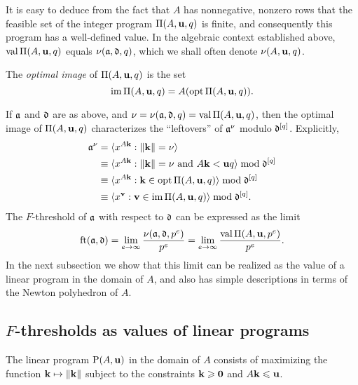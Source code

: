 \documentclass[11pt]{amsart}
\begin{document}
It is easy to deduce from the fact that $A$ has nonnegative, nonzero rows that the feasible set of the integer program $\Pi(A,\mathbf{u},q)$ is finite, and consequently this program has a well-defined value.
In the algebraic context established above, $\operatorname{val} \Pi(A,\mathbf{u},q)$ equals $\nu(\mathfrak{a},\mathfrak{d},q)$, which we shall often denote $\nu(A,\mathbf{u},q)$.

\begin{definition}
   The \emph{optimal image} of $\Pi(A, \mathbf{u}, q)$ is the set \[ \operatorname{im} \Pi(A, \mathbf{u}, q) = A ( \operatorname{opt} \Pi(A, \mathbf{u}, q) ). \] 
\end{definition}

If $\mathfrak{a}$ and $\mathfrak{d}$ are as above, and $\nu = \nu(\mathfrak{a},\mathfrak{d},q) = \operatorname{val} \Pi(A,\mathbf{u},q)$, then the optimal image of $\Pi(A,\mathbf{u},q)$ characterizes the ``leftovers'' of $\mathfrak{a}^\nu$ modulo $\mathfrak{d}^{[q]}$.
Explicitly,
\begin{align*}
  \mathfrak{a}^{\nu} &= \langle x^{A\mathbf{k}}: \| \mathbf{k} \|=\nu \rangle\\
  &\equiv \langle x^{A\mathbf{k}}: \| \mathbf{k} \|=\nu\text{ and } A\mathbf{k} <\mathbf{u}q \rangle \bmod \mathfrak{d}^{[q]}\\
  &\equiv \langle x^{A\mathbf{k}}: \mathbf{k}\in \operatorname{opt}\Pi(A,\mathbf{u},q) \rangle \bmod \mathfrak{d}^{[q]}\\
  &\equiv \langle x^{\mathbf{v}}: \mathbf{v} \in \operatorname{im} \Pi(A,\mathbf{u},q) \rangle \bmod \mathfrak{d}^{[q]}.
\end{align*}
The $F$-threshold of $\mathfrak{a}$ with respect to $\mathfrak{d}$ can be expressed as the limit
\begin{equation}\label{eq: limit}
\operatorname{ft}(\mathfrak{a}, \mathfrak{d}) = \lim_{e\to\infty} \frac{\nu(\mathfrak{a},\mathfrak{d},p^e)}{p^e} = \lim_{e\to\infty} \frac{\operatorname{val} \Pi(A,\mathbf{u},p^e)}{p^e}.
\end{equation}
In the next subsection we show that this limit can be realized as the value of a linear program in the domain of $A$, and also has simple descriptions in terms of the Newton polyhedron of $A$.

\subsection{$F$-thresholds as values of linear programs}

\begin{definition}
   The linear program $\mathrm{P}(A, \mathbf{u})$ in the domain of $A$ consists of maximizing the function $\mathbf{k} \mapsto \| \mathbf{k} \|$ subject to the constraints $\mathbf{k} \geqslant \mathbf{0}$ and $A \mathbf{k} \leqslant \mathbf{u}$.
\end{definition}
\end{document}
